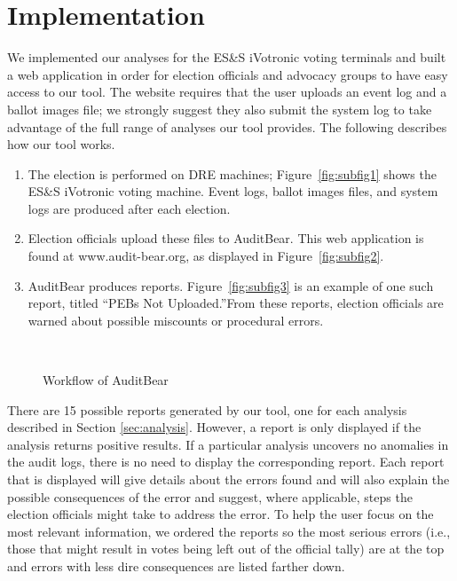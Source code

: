 \section{Implementation}
We implemented our analyses for the ES\&S iVotronic voting terminals
and built a web application in order for election officials and
advocacy groups to have easy access to our tool. The website requires
that the user uploads an event log and a ballot images file; we strongly
suggest they also submit the system log to take advantage of the
full range of analyses our tool provides.  The following describes how
our tool works.   

\begin{enumerate}
\item
The election is performed on DRE machines; Figure~\ref{fig:subfig1} shows the ES\&S iVotronic voting machine.  Event logs, ballot images files, and system logs are produced after each election.
\item
Election officials upload these files to AuditBear.  This web application is found at www.audit-bear.org, as displayed in Figure~\ref{fig:subfig2}.  
\item
AuditBear produces reports.  Figure~\ref{fig:subfig3} is an example of
one such report, titled \textquotedblleft PEBs Not
Uploaded.\textquotedblright From these reports, election officials are
warned about possible miscounts or procedural errors.  
\end{enumerate}

\begin{figure}[h]
\centering
\mbox{
}
\caption{Workflow of AuditBear}
\label{auditBear}
\end{figure}


There are 15 possible reports generated by our tool, one
for each analysis described in Section \ref{sec:analysis}.  However, a report is only
displayed if the analysis returns positive results. If a particular
analysis uncovers no anomalies in the audit logs, there is no need to display the
corresponding report. Each report that is displayed will give details
about the errors found and will
also explain the possible consequences of the error and suggest, where
applicable, steps the election officials might take to address
the error. To help the user focus on the most relevant information, we
ordered the reports so the most serious errors (i.e., those that might
result in votes being left out of the official tally) are at the top
and errors with less dire consequences are listed farther down. 
